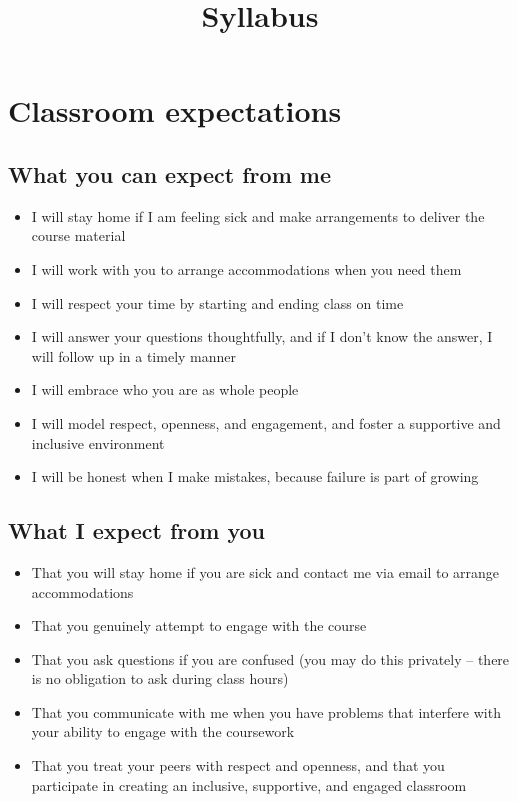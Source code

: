 \documentclass[
  letterpaper,
  DIV=11,
  numbers=noendperiod]{scrartcl}
\title{Syllabus}
\author{}
\date{}
\providecommand{\tightlist}{%
  \setlength{\itemsep}{0pt}\setlength{\parskip}{0pt}}\usepackage{longtable,booktabs,array}
\renewcommand*\contentsname{Table of contents}
\newcommand\contentsname{Table of contents}
\begin{document}
\maketitle

\renewcommand*\contentsname{Table of contents}
{
\hypersetup{linkcolor=}
\setcounter{tocdepth}{3}
\tableofcontents
}
\section{Classroom expectations}\label{classexpectations}

\subsection{What you can expect from me}

\begin{itemize}
\tightlist
\item
  I will stay home if I am feeling sick and make arrangements to deliver
  the course material
\item
  I will work with you to arrange accommodations when you need them
\item
  I will respect your time by starting and ending class on time
\item
  I will answer your questions thoughtfully, and if I don't know the
  answer, I will follow up in a timely manner
\item
  I will embrace who you are as whole people
\item
  I will model respect, openness, and engagement, and foster a
  supportive and inclusive environment
\item
  I will be honest when I make mistakes, because failure is part of
  growing
\end{itemize}

\subsection{What I expect from you}

\begin{itemize}
\tightlist
\item
  That you will stay home if you are sick and contact me via email to
  arrange accommodations
\item
  That you genuinely attempt to engage with the course
\item
  That you ask questions if you are confused (you may do this privately
  -- there is no obligation to ask during class hours)
\item
  That you communicate with me when you have problems that interfere
  with your ability to engage with the coursework
\item
  That you treat your peers with respect and openness, and that you
  participate in creating an inclusive, supportive, and engaged
  classroom
\end{itemize}
\end{document}
